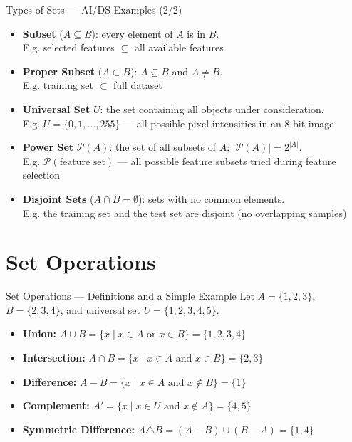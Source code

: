 \documentclass[10pt]{beamer}
\begin{document}
\begin{frame}{Types of Sets --- AI/DS Examples (2/2)}
  \scriptsize
  \begin{itemize}
    \item \textbf{Subset} ($A \subseteq B$): every element of $A$ is in $B$.
    \\ E.g. selected features $\subseteq$ all available features
    \item \textbf{Proper Subset} ($A \subset B$): $A \subseteq B$ and $A \neq B$.
    \\ E.g. training set $\subset$ full dataset
    \item \textbf{Universal Set} $U$: the set containing all objects under consideration.
    \\ E.g. $U = \{0,1,\dots,255\}$ --- all possible pixel intensities in an 8-bit image
    \item \textbf{Power Set} $\mathcal{P}(A)$: the set of all subsets of $A$; $|\mathcal{P}(A)| = 2^{|A|}$.
    \\ E.g. $\mathcal{P}(\text{feature set})$ --- all possible feature subsets tried during feature selection
    \item \textbf{Disjoint Sets} ($A \cap B = \emptyset$): sets with no common elements.
    \\ E.g. the training set and the test set are disjoint (no overlapping samples)
  \end{itemize}
\end{frame}

\section{Set Operations}
\begin{frame}{Set Operations --- Definitions and a Simple Example}
  \small
  Let $A = \{1,2,3\}$, $B = \{2,3,4\}$, and universal set $U = \{1,2,3,4,5\}$.
  \begin{itemize}
    \item \textbf{Union:} $A \cup B = \{x \mid x \in A \text{ or } x \in B\} = \{1,2,3,4\}$
    \item \textbf{Intersection:} $A \cap B = \{x \mid x \in A \text{ and } x \in B\} = \{2,3\}$
    \item \textbf{Difference:} $A - B = \{x \mid x \in A \text{ and } x \notin B\} = \{1\}$
    \item \textbf{Complement:} $A' = \{x \mid x \in U \text{ and } x \notin A\} = \{4,5\}$
    \item \textbf{Symmetric Difference:} $A \triangle B = (A - B) \cup (B - A) = \{1,4\}$
  \end{itemize}
\end{frame}
\end{document}
